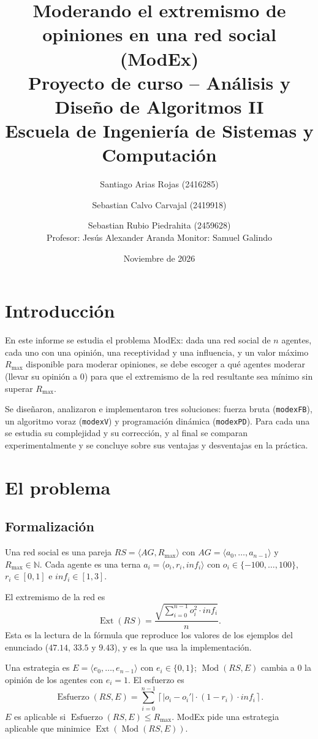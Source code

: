 \documentclass[11pt,letterpaper]{article}
\title{\textbf{Moderando el extremismo de opiniones en una red social (ModEx)}\\[0.5em]
\large Proyecto de curso -- Análisis y Diseño de Algoritmos II\\
Escuela de Ingeniería de Sistemas y Computación}
\author{Santiago Arias Rojas (2416285) \and Sebastian Calvo Carvajal (2419918) \and Sebastian Rubio Piedrahita (2459628)\\[0.5em]
Profesor: Jesús Alexander Aranda \quad Monitor: Samuel Galindo}
\date{Noviembre de 2026}
\newcommand{\Ext}{\operatorname{Ext}}
\newcommand{\Esf}{\operatorname{Esfuerzo}}
\newcommand{\Mod}{\operatorname{Mod}}
\newcommand{\Rmax}{R_{\max}}
\begin{document}
\maketitle
\tableofcontents
\newpage

\section{Introducción}

En este informe se estudia el problema ModEx: dada una red social de $n$
agentes, cada uno con una opinión, una receptividad y una influencia, y un
valor máximo $\Rmax$ disponible para moderar opiniones, se debe escoger a qué
agentes moderar (llevar su opinión a $0$) para que el extremismo de la red
resultante sea mínimo sin superar $\Rmax$.

Se diseñaron, analizaron e implementaron tres soluciones: fuerza bruta
(\texttt{modexFB}), un algoritmo voraz (\texttt{modexV}) y programación
dinámica (\texttt{modexPD}). Para cada una se estudia su complejidad y su
corrección, y al final se comparan experimentalmente y se concluye sobre sus
ventajas y desventajas en la práctica.

\section{El problema}

\subsection{Formalización}

Una red social es una pareja $RS = \langle AG, \Rmax \rangle$ con
$AG = \langle a_0,\dots,a_{n-1}\rangle$ y $\Rmax \in \mathbb{N}$. Cada agente
es una terna $a_i = \langle o_i, r_i, inf_i\rangle$ con
$o_i \in \{-100,\dots,100\}$, $r_i \in [0,1]$ e $inf_i \in [1,3]$.

El extremismo de la red es
\[
  \Ext(RS) = \frac{\sqrt{\sum_{i=0}^{n-1} o_i^2 \cdot inf_i}}{n}.
\]
Esta es la lectura de la fórmula que reproduce los valores de los ejemplos
del enunciado ($47.14$, $33.5$ y $9.43$), y es la que usa la implementación.

Una estrategia es $E = \langle e_0,\dots,e_{n-1}\rangle$ con
$e_i \in \{0,1\}$; $\Mod(RS,E)$ cambia a $0$ la opinión de los agentes con
$e_i = 1$. El esfuerzo es
\[
  \Esf(RS,E) = \sum_{i=0}^{n-1}\left\lceil |o_i - o_i'| \cdot (1-r_i)\cdot inf_i \right\rceil .
\]
$E$ es aplicable si $\Esf(RS,E) \le \Rmax$. ModEx pide una estrategia
aplicable que minimice $\Ext(\Mod(RS,E))$.
\end{document}
